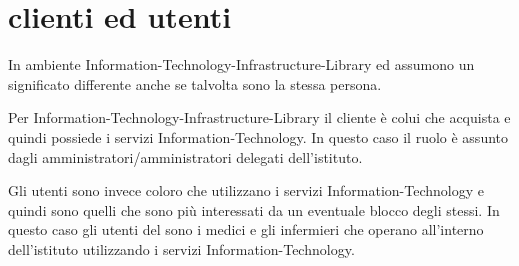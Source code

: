 %
%
\section[Clienti ed utenti]{clienti ed utenti}
\label{sd-client-users}
In ambiente \ac{Information-Technology-Infrastructure-Library}  ed  assumono un significato differente anche se talvolta sono la stessa persona.

Per \ac{Information-Technology-Infrastructure-Library} il cliente è colui che acquista e quindi possiede i servizi \acs{Information-Technology}. In questo caso il ruolo è assunto dagli amministratori/amministratori delegati dell'istituto.

Gli utenti sono invece coloro che utilizzano i servizi \acs{Information-Technology} e quindi sono quelli che sono più interessati da un eventuale blocco degli stessi. In questo caso gli utenti del  sono i medici e gli infermieri che operano all'interno dell'istituto utilizzando i servizi \acs{Information-Technology}.